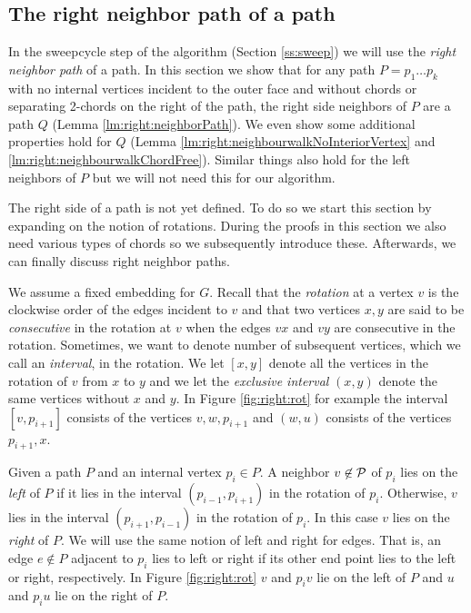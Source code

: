 
\subsection{The right neighbor path of a path}
\thispagestyle{plain}
  \label{ss:rightNeighbour}
  In the sweepcycle step of the algorithm (Section \ref{ss:sweep}) we will use the \emph{right neighbor path} of a path. In this section we show that for any path $P = p_1 \ldots p_k$ with no internal vertices incident to the outer face and without chords or separating 2-chords on the right of the path, the right side neighbors of $P$ are a path $Q$ (Lemma \ref{lm:right:neighborPath}).
  We even show some additional properties hold for $Q$ (Lemma  \ref{lm:right:neighbourwalkNoInteriorVertex} and \ref{lm:right:neighbourwalkChordFree}).
  Similar things also hold for the left neighbors of $P$ but we will not need this for our algorithm.

  The right side of a path is not yet defined. To do so we start this section by expanding on the notion of rotations. During the proofs in this section we also need various types of chords so we subsequently introduce these. Afterwards, we can finally discuss right neighbor paths.

    We assume a fixed embedding for $G$. Recall that the \emph{rotation} at a vertex $v$ is the clockwise order of the edges incident to $v$ and that two vertices $x, y$ are said to be \emph{consecutive} in the rotation at $v$ when the edges $vx$ and $vy$ are consecutive in the rotation.
    Sometimes, we want to denote number of subsequent vertices, which we call an \emph{interval}, in the rotation. We let $[x,y]$ denote all the vertices in the rotation of $v$ from $x$ to $y$ and we let the \emph{exclusive interval} $(x,y)$ denote the same vertices without $x$ and $y$. In Figure \ref{fig:right:rot} for example the interval $[v,p_{i+1}]$ consists of the vertices $v,w,p_{i+1}$ and $(w,u)$ consists of the vertices $p_{i+1}, x$.

    Given a path $P$ and an internal vertex $p_i \in P$. A neighbor $v \not \in \mathcal{P}$ of $p_i$ lies on the \emph{left} of $P$ if it lies in the interval $(p_{i-1}, p_{i+1})$ in the rotation of $p_{i}$. Otherwise, $v$ lies in the interval $(p_{i+1}, p_{i-1})$ in the rotation of $p_i$. In this case $v$ lies on the \emph{right} of $P$.
    We will use the same notion of left and right for edges. That is, an edge $e\nin P$ adjacent to $p_i$ lies to left or right if its other end point lies to the left or right, respectively. In Figure \ref{fig:right:rot} $v$ and $p_i v$ lie on the left of $P$ and $u$ and $p_i u$ lie on the right of $P$.

